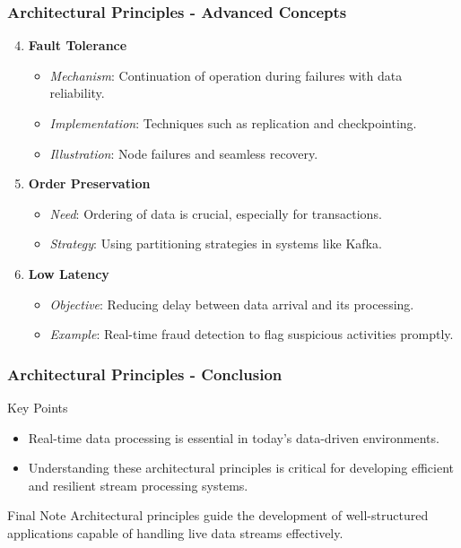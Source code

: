 \documentclass[aspectratio=169]{beamer}
\begin{document}
\begin{frame}[fragile]
    \frametitle{Architectural Principles - Advanced Concepts}
    \begin{enumerate}
        \setcounter{enumi}{3}
        \item \textbf{Fault Tolerance}
        \begin{itemize}
            \item \textit{Mechanism}: Continuation of operation during failures with data reliability.
            \item \textit{Implementation}: Techniques such as replication and checkpointing.
            \item \textit{Illustration}: Node failures and seamless recovery.
        \end{itemize}
        
        \item \textbf{Order Preservation}
        \begin{itemize}
            \item \textit{Need}: Ordering of data is crucial, especially for transactions.
            \item \textit{Strategy}: Using partitioning strategies in systems like Kafka.
        \end{itemize}
        
        \item \textbf{Low Latency}
        \begin{itemize}
            \item \textit{Objective}: Reducing delay between data arrival and its processing.
            \item \textit{Example}: Real-time fraud detection to flag suspicious activities promptly.
        \end{itemize}
    \end{enumerate}
\end{frame}

\begin{frame}[fragile]
    \frametitle{Architectural Principles - Conclusion}
    \begin{block}{Key Points}
        \begin{itemize}
            \item Real-time data processing is essential in today’s data-driven environments.
            \item Understanding these architectural principles is critical for developing efficient and resilient stream processing systems.
        \end{itemize}
    \end{block}
    
    \begin{block}{Final Note}
        Architectural principles guide the development of well-structured applications capable of handling live data streams effectively.
    \end{block}
\end{frame}
\end{document}

